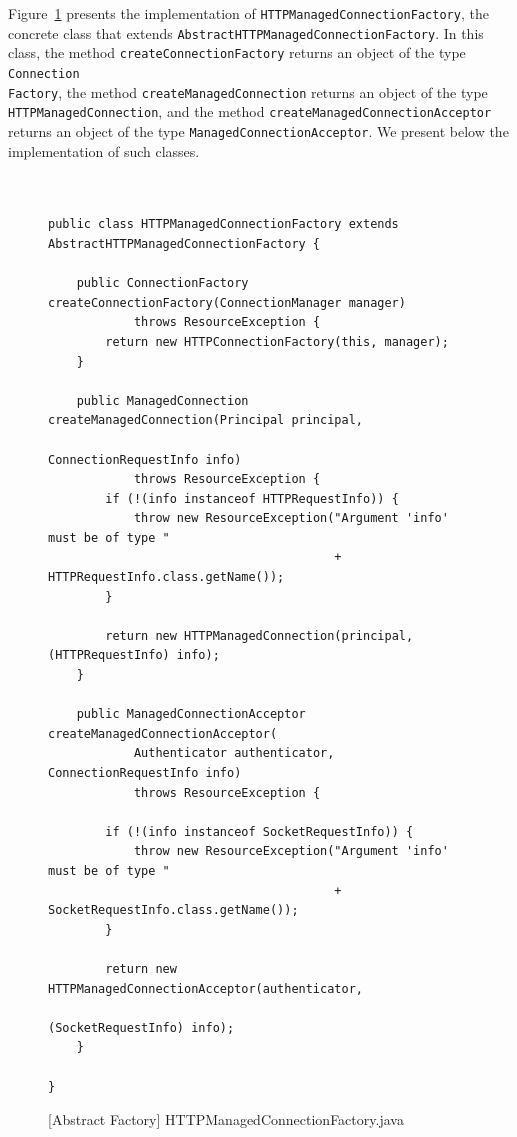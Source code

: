 Figure~\ref{fig:HTTPManagedConnectionFactory} presents the implementation of \texttt{HTTPManagedConnectionFactory}, the concrete class that extends \texttt{AbstractHTTPManagedConnectionFactory}. In this class, the method \texttt{createConnectionFactory} returns an object of the type \texttt{Connection\\Factory}, the method \texttt{createManagedConnection} returns an object of the type \texttt{HTTPManagedConnection}, and the method \texttt{createManagedConnectionAcceptor} returns an object of the type \texttt{ManagedConnectionAcceptor}. We present below the implementation of such classes. 

\begin{figure}[htb]
\centering
\lstset{language=Java, basicstyle=\scriptsize, stepnumber=1, showspaces=false, showstringspaces=false,breaklines=true}
\begin{lstlisting}


public class HTTPManagedConnectionFactory extends AbstractHTTPManagedConnectionFactory {

    public ConnectionFactory createConnectionFactory(ConnectionManager manager)
            throws ResourceException {
        return new HTTPConnectionFactory(this, manager);
    }

    public ManagedConnection createManagedConnection(Principal principal,
                                                     ConnectionRequestInfo info)
            throws ResourceException {
        if (!(info instanceof HTTPRequestInfo)) {
            throw new ResourceException("Argument 'info' must be of type "
                                        + HTTPRequestInfo.class.getName());
        }

        return new HTTPManagedConnection(principal, (HTTPRequestInfo) info);
    }

    public ManagedConnectionAcceptor createManagedConnectionAcceptor(
            Authenticator authenticator, ConnectionRequestInfo info)
            throws ResourceException {

        if (!(info instanceof SocketRequestInfo)) {
            throw new ResourceException("Argument 'info' must be of type "
                                        + SocketRequestInfo.class.getName());
        }

        return new HTTPManagedConnectionAcceptor(authenticator,
                                                 (SocketRequestInfo) info);
    }

}
\end{lstlisting}
\caption{[Abstract Factory] HTTPManagedConnectionFactory.java}
\label{fig:HTTPManagedConnectionFactory}
\end{figure}
\FloatBarrier

